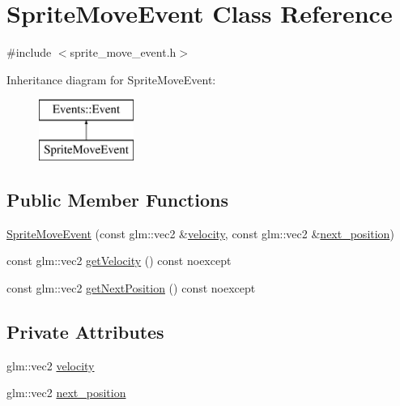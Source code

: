 \hypertarget{class_sprite_move_event}{}\section{Sprite\+Move\+Event Class Reference}
\label{class_sprite_move_event}


{\ttfamily \#include $<$sprite\+\_\+move\+\_\+event.\+h$>$}

Inheritance diagram for Sprite\+Move\+Event\+:\begin{figure}[H]
\begin{center}
\leavevmode
\includegraphics[height=2.000000cm]{class_sprite_move_event}
\end{center}
\end{figure}
\subsection*{Public Member Functions}
\begin{DoxyCompactItemize}
\item 
\hyperlink{class_sprite_move_event_af6f93f4fbedec36476948d5df7e15893}{Sprite\+Move\+Event} (const glm\+::vec2 \&\hyperlink{class_sprite_move_event_abf71a5443922204d31f96c14c1bc4dc0}{velocity}, const glm\+::vec2 \&\hyperlink{class_sprite_move_event_ad78a204593fa7266b54757758930606a}{next\+\_\+position})
\item 
const glm\+::vec2 \hyperlink{class_sprite_move_event_a8976431305e829b657d997ff3079aa15}{get\+Velocity} () const noexcept
\item 
const glm\+::vec2 \hyperlink{class_sprite_move_event_acd7f74b4dc39ce21f47395ef5fdb96e8}{get\+Next\+Position} () const noexcept
\end{DoxyCompactItemize}
\subsection*{Private Attributes}
\begin{DoxyCompactItemize}
\item 
glm\+::vec2 \hyperlink{class_sprite_move_event_abf71a5443922204d31f96c14c1bc4dc0}{velocity}
\item 
glm\+::vec2 \hyperlink{class_sprite_move_event_ad78a204593fa7266b54757758930606a}{next\+\_\+position}
\end{DoxyCompactItemize}


